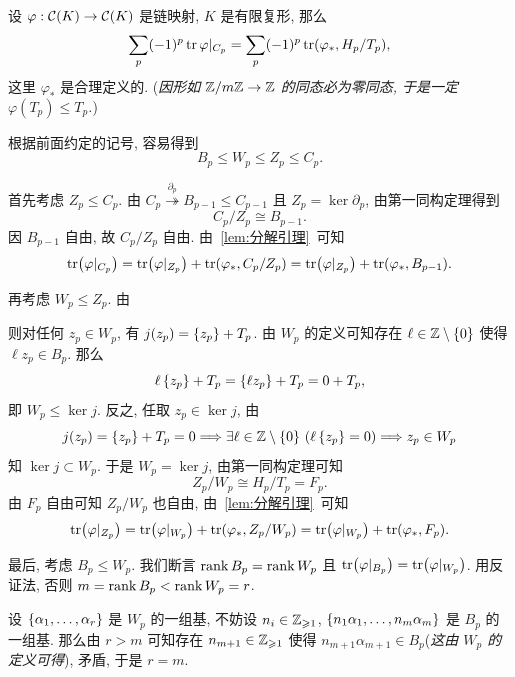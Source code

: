 \begin{Theorem}
	设 $ \varphi : \mathcal{C}(K)\to\mathcal{C}(K) $ 是链映射, $ K $ 是有限复形, 那么
	\[
		\sum_{p}(-1)^p\tr\varphi|_{C_p}=\sum_{p}(-1)^p\tr(\varphi_*, H_p/T_p),
	\]
	这里 $ \varphi_* $ 是合理定义的. (\textit{因形如 $ \mathbb{Z}/m\mathbb{Z}\to\mathbb{Z} $ 的同态必为零同态, 于是一定 $ \varphi(T_p)\leqslant T_p $.})
\end{Theorem}
\begin{Proof}
	根据前面约定的记号, 容易得到
	\[
		B_p\leqslant W_p\leqslant Z_p\leqslant C_p.
	\]

	首先考虑 $ Z_p\leqslant C_p $. 由 $ C_p\stackrel{\partial_p}{\twoheadrightarrow}B_{p-1}\leqslant C_{p-1} $ 且 $ Z_p=\ker\partial_p $, 由第一同构定理得到
	\[
		C_p/Z_p\cong B_{p-1}.
	\]
	因 $ B_{p-1} $ 自由, 故 $ C_p/Z_p $ 自由. 由~\ref{lem:分解引理}~可知
	\[
		\tr(\varphi|_{C_p})=\tr(\varphi|_{Z_p})+\tr(\varphi_*,C_p/Z_p)=\tr(\varphi|_{Z_p})+\tr(\varphi_*,B_{p-1}).
	\]

	再考虑 $ W_p\leqslant Z_p $. 由
	\begin{center}
	\end{center}
	则对任何 $ z_p\in W_p $, 有 $ j(z_p)=\left\{ z_p \right\}+T_p $. 由 $ W_p $ 的定义可知存在 $ \ell\in\mathbb{Z}\setminus\left\{ 0 \right\} $ 使得 $ \ell z_p\in B_p $. 那么
	\[
		\ell\left\{ z_p \right\}+T_p=\left\{ \ell z_p \right\}+T_p=0+T_p,
	\]
	即 $ W_p\leqslant\ker j $. 反之, 任取 $ z_p\in\ker j $, 由
	\[
		j(z_p)=\left\{ z_p \right\}+T_p=0\Longrightarrow\exists\ell\in\mathbb{Z}\setminus\left\{ 0 \right\}\,(\ell\left\{ z_p \right\}=0)\Longrightarrow z_p\in W_p
	\]
	知 $ \ker j\subset W_p $. 于是 $ W_p=\ker j $, 由第一同构定理可知
	\[
		Z_p/W_p\cong H_p/T_p=F_p.
	\]
	由 $ F_p $ 自由可知 $ Z_p/W_p $ 也自由, 由~\ref{lem:分解引理}~可知
	\[
		\tr(\varphi|_{Z_p})=\tr(\varphi|_{W_p})+\tr(\varphi_*,Z_p/W_p)=\tr(\varphi|_{W_p})+\tr(\varphi_*,F_p).
	\]

	最后, 考虑 $ B_p\leqslant W_p $. 我们断言 $ \mathrm{rank}\, B_p=\mathrm{rank}\, W_p $ 且 $ \tr(\varphi|_{B_p})=\tr(\varphi|_{W_p}) $. 用反证法, 否则 $ m=\mathrm{rank}\, B_p<\mathrm{rank}\, W_p=r $.

	设 $ \left\{ \alpha_1,\dots,\alpha_r \right\} $ 是 $ W_p $ 的一组基, 不妨设 $ n_i\in\mathbb{Z}_{\geqslant 1} $, $ \left\{ n_1\alpha_1,\dots,n_m\alpha_m \right\} $ 是 $ B_p $ 的一组基. 那么由 $ r>m $ 可知存在 $ n_{m+1}\in\mathbb{Z}_{\geqslant 1} $ 使得 $ n_{m+1}\alpha_{m+1}\in B_p $(\textit{这由 $ W_p $ 的定义可得}), 矛盾, 于是 $ r=m $.


\end{Proof}
